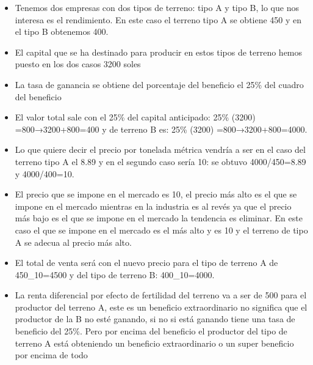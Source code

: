 \documentclass[
  a4paper,
]{article}
\begin{document}
\begin{itemize}
\item
  Tenemos dos empresas con dos tipos de terreno: tipo A y tipo B, lo que
  nos interesa es el rendimiento. En este caso el terreno tipo A se
  obtiene 450 y en el tipo B obtenemos 400.
\item
  El capital que se ha destinado para producir en estos tipos de terreno
  hemos puesto en los dos casos 3200 soles
\item
  La tasa de ganancia se obtiene del porcentaje del beneficio el 25\%
  del cuadro del beneficio
\item
  El valor total sale con el 25\% del capital anticipado: 25\% (3200)
  =800→3200+800=400 y de terreno B es: 25\% (3200) =800→3200+800=4000.
\item
  Lo que quiere decir el precio por tonelada métrica vendría a ser en el
  caso del terreno tipo A el 8.89 y en el segundo caso sería 10: se
  obtuvo 4000/450=8.89 y 4000/400=10.
\item
  El precio que se impone en el mercado es 10, el precio más alto es el
  que se impone en el mercado mientras en la industria es al revés ya
  que el precio más bajo es el que se impone en el mercado la tendencia
  es eliminar. En este caso el que se impone en el mercado es el más
  alto y es 10 y el terreno de tipo A se adecua al precio más alto.
\item
  El total de venta será con el nuevo precio para el tipo de terreno A
  de 450\_10=4500 y del tipo de terreno B: 400\_10=4000.
\item
  La renta diferencial por efecto de fertilidad del terreno va a ser de
  500 para el productor del terreno A, este es un beneficio
  extraordinario no significa que el productor de la B no esté ganando,
  si no si está ganando tiene una tasa de beneficio del 25\%. Pero por
  encima del beneficio el productor del tipo de terreno A está
  obteniendo un beneficio extraordinario o un super beneficio por encima
  de todo
\end{itemize}
\end{document}
